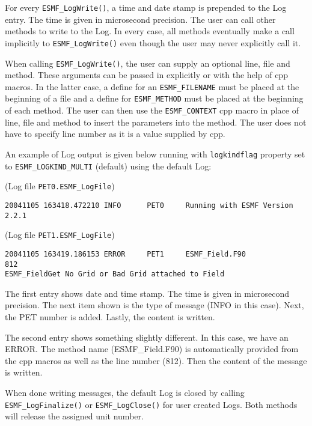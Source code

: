 For every {\tt ESMF\_LogWrite()}, a time and date stamp is prepended to the
Log entry.  The time is given in microsecond precision.  The user can call 
other methods to write to the Log.  In every case, all methods eventually make 
a call implicitly to {\tt ESMF\_LogWrite()} even though the user may never 
explicitly call it.

When calling {\tt ESMF\_LogWrite()}, the user can supply an optional line,
file and method.  These arguments can be passed in explicitly or with the help
of cpp macros.  In the latter case, a define for an {\tt ESMF\_FILENAME} must 
be placed at the beginning of a file and a define for {\tt ESMF\_METHOD} must
be placed at the beginning of each method.  The user can then use the
{\tt ESMF\_CONTEXT} cpp macro in place of line, file and method to insert the 
parameters into the method.  The user does not have to specify line number as
it is a value supplied by cpp.

An example of Log output is given below running with {\tt logkindflag} 
property set to {\tt ESMF\_LOGKIND\_MULTI} (default) using the default Log:

(Log file {\tt PET0.ESMF\_LogFile})
\begin{verbatim}
20041105 163418.472210 INFO      PET0     Running with ESMF Version 2.2.1   
\end{verbatim}

(Log file {\tt PET1.ESMF\_LogFile})
\begin{verbatim}
20041105 163419.186153 ERROR     PET1     ESMF_Field.F90             812  
ESMF_FieldGet No Grid or Bad Grid attached to Field
\end{verbatim}

The first entry shows date and time stamp.  The time is given in microsecond 
precision.  The next item shown is the type of message (INFO in this case).  
Next, the PET number is added.  Lastly, the content is written.

\begin{sloppypar}
The second entry shows something slightly different.  In this case, we have
an ERROR.  The method name (ESMF\_Field.F90) is automatically provided from 
the cpp macros as well as the line number (812).  Then the content of the 
message is written.
\end{sloppypar}
 
When done writing messages, the default Log is closed by calling 
{\tt ESMF\_LogFinalize()}  or {\tt ESMF\_LogClose()} for user created Logs.  
Both methods will release the assigned unit number.

